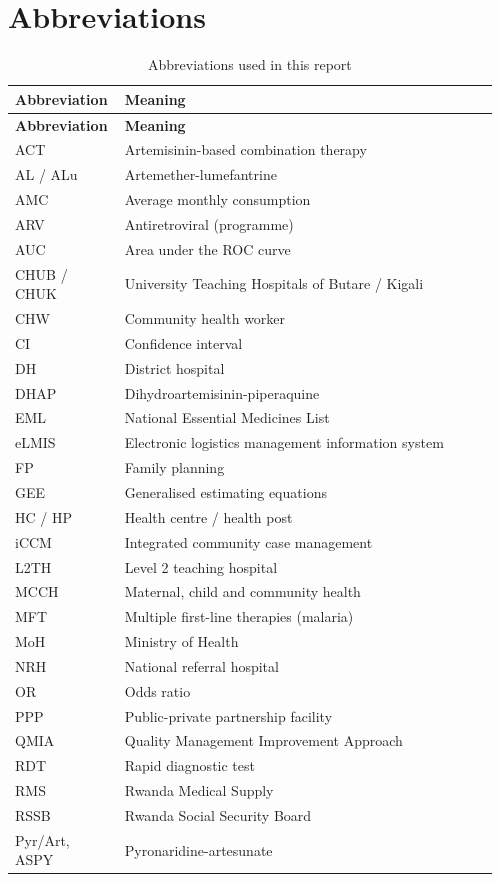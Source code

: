 \documentclass[10pt,a4paper]{report}
\begin{document}
\chapter*{Abbreviations}
{\footnotesize\setlength{\tabcolsep}{3pt}\renewcommand{\arraystretch}{1.15}
\begin{longtable}{>{\raggedright\arraybackslash}p{0.210\linewidth}>{\raggedright\arraybackslash}p{0.750\linewidth}}
\caption{Abbreviations used in this report}\\
\rowcolor{navy}\textbf{\color{white}Abbreviation} & \textbf{\color{white}Meaning} \\
\endfirsthead
\rowcolor{navy}\textbf{\color{white}Abbreviation} & \textbf{\color{white}Meaning} \\
\endhead
ACT & Artemisinin-based combination therapy \\
\rowcolor{band}AL / ALu & Artemether-lumefantrine \\
AMC & Average monthly consumption \\
\rowcolor{band}ARV & Antiretroviral (programme) \\
AUC & Area under the ROC curve \\
\rowcolor{band}CHUB / CHUK & University Teaching Hospitals of Butare / Kigali \\
CHW & Community health worker \\
\rowcolor{band}CI & Confidence interval \\
DH & District hospital \\
\rowcolor{band}DHAP & Dihydroartemisinin-piperaquine \\
EML & National Essential Medicines List \\
\rowcolor{band}eLMIS & Electronic logistics management information system \\
FP & Family planning \\
\rowcolor{band}GEE & Generalised estimating equations \\
HC / HP & Health centre / health post \\
\rowcolor{band}iCCM & Integrated community case management \\
L2TH & Level 2 teaching hospital \\
\rowcolor{band}MCCH & Maternal, child and community health \\
MFT & Multiple first-line therapies (malaria) \\
\rowcolor{band}MoH & Ministry of Health \\
NRH & National referral hospital \\
\rowcolor{band}OR & Odds ratio \\
PPP & Public-private partnership facility \\
\rowcolor{band}QMIA & Quality Management Improvement Approach \\
RDT & Rapid diagnostic test \\
\rowcolor{band}RMS & Rwanda Medical Supply \\
RSSB & Rwanda Social Security Board \\
\rowcolor{band}Pyr/Art, ASPY & Pyronaridine-artesunate \\
\end{longtable}}
\end{document}
